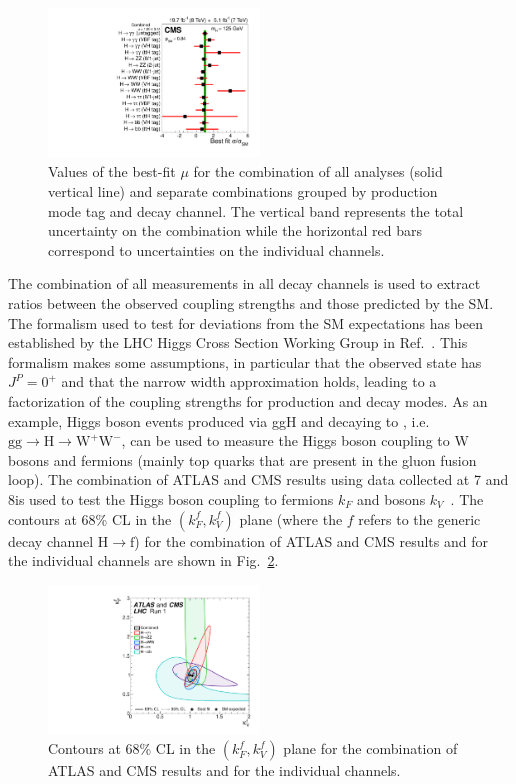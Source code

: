 \begin{figure}[htb]
\centering
\includegraphics[width=0.5\textwidth]{images/signal_strengths.pdf}
\caption{Values of the best-fit $\mu$ for the combination of all analyses (solid vertical line) and separate combinations grouped by production mode tag and decay channel. The vertical band represents the total uncertainty on the combination while the horizontal red bars correspond to uncertainties on the individual channels.}\label{fig:signal_strengths}
\end{figure}

The combination of all measurements in all decay channels is used to extract ratios between the observed coupling strengths and those predicted by the SM. The formalism used to test for deviations from the SM expectations has been established by the LHC Higgs Cross Section Working Group in Ref.~\cite{Heinemeyer:2013tqa}. This formalism makes some assumptions, in particular that the observed state has $J^P =0^+$ and that the narrow width approximation holds, leading to a factorization of the coupling strengths for production and decay modes. As an example, Higgs boson events produced via ggH and decaying to \WW, i.e. $\mathrm{gg\to H\to W^+W^-}$, can be used to measure the Higgs boson coupling to W bosons and fermions (mainly top quarks that are present in the gluon fusion loop). The combination of ATLAS and CMS results using data collected at 7 and 8\TeV is used to test the Higgs boson coupling to fermions $k_F$ and bosons $k_V$~\cite{Khachatryan:2016vau}. The contours at 68\% CL in the $(k_F^f, k_V^f)$ plane (where the $f$ refers to the generic decay channel $\mathrm{H\to f}$) for the combination of ATLAS and CMS results and for the individual channels are shown in Fig.~\ref{fig:couplings}.

\begin{figure}[htb]
\centering
\includegraphics[width=0.5\textwidth]{images/couplings.pdf}
\caption{Contours at 68\% CL in the $(k_F^f, k_V^f)$ plane for the combination of ATLAS and CMS results and for the individual channels.}\label{fig:couplings}
\end{figure}

